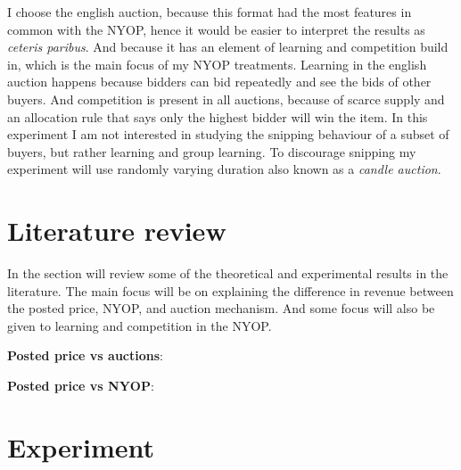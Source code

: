 \documentclass[a4paper,12pt]{article}
\begin{document}
	I choose the english auction, because this format had the most features in common with the NYOP, hence it would be easier to interpret the results as {\it ceteris paribus}. And because it has an element of learning and competition build in, which is the main focus of my NYOP treatments. Learning in the english auction happens because bidders can bid repeatedly and see the bids of other buyers. And competition is present in all auctions, because of scarce supply and an allocation rule that says only the highest bidder will win the item. In this experiment I am not interested in studying the snipping behaviour of a subset of buyers, but rather learning and group learning. To discourage snipping my experiment will use randomly varying duration also known as a {\it candle auction}.

	\section{Literature review}

	In the section will review some of the theoretical and experimental results in the literature. The main focus will be on explaining the difference in revenue between the posted price, NYOP, and auction mechanism. And some focus will also be given to learning and competition in the NYOP.


	{\bf Posted price vs auctions}:

	{\bf Posted price vs NYOP}:


	\section{Experiment}
\end{document}
